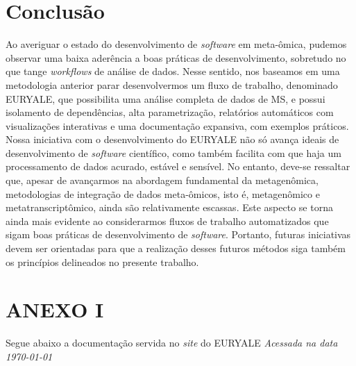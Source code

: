 \documentclass[
	12pt,				%
	oneside,			%
	a4paper,			%
	chapter=TITLE,		%
	section=TITLE,		%
	english,			%
	brazil				%
	]{abntex2}
\begin{document}
\chapter{Conclusão}\label{conclusuxe3o}

Ao averiguar o estado do desenvolvimento de \emph{software} em meta-ômica, pudemos observar
uma baixa aderência a boas práticas de desenvolvimento, sobretudo no que tange \emph{workflows}
de análise de dados. Nesse sentido, nos baseamos em uma metodologia anterior parar desenvolvermos um fluxo de trabalho, denominado EURYALE,
que possibilita uma análise completa de dados de \gls{MS}, e possui isolamento de dependências, alta parametrização, relatórios automáticos com visualizações interativas e uma documentação expansiva, com exemplos práticos.
Nossa iniciativa com o desenvolvimento do EURYALE não só avança ideais de desenvolvimento de \emph{software} científico, como também facilita com que haja um processamento de dados acurado, estável e sensível.
No entanto, deve-se ressaltar que, apesar de avançarmos na abordagem fundamental da metagenômica, metodologias de integração de dados
meta-ômicos, isto é, metagenômico e metatranscriptômico, ainda são relativamente escassas. Este aspecto se torna ainda mais evidente ao considerarmos fluxos de trabalho automatizados que sigam boas práticas de desenvolvimento de \emph{software}.
Portanto, futuras iniciativas devem ser orientadas para que a realização desses futuros métodos siga também os princípios delineados no presente trabalho.

\postextual

\begingroup

\printbibliography[title=REFERÊNCIAS]

\endgroup


\chapter{ANEXO I}\label{anexo-i}
\begin{center}
Segue abaixo a documentação servida no \textit{site} do EURYALE
\bigskip\newline
\textit{Acessada na data \today}
\end{center}
\begin{fichacatalografica}
    
\end{fichacatalografica}
%
%

\end{document}
